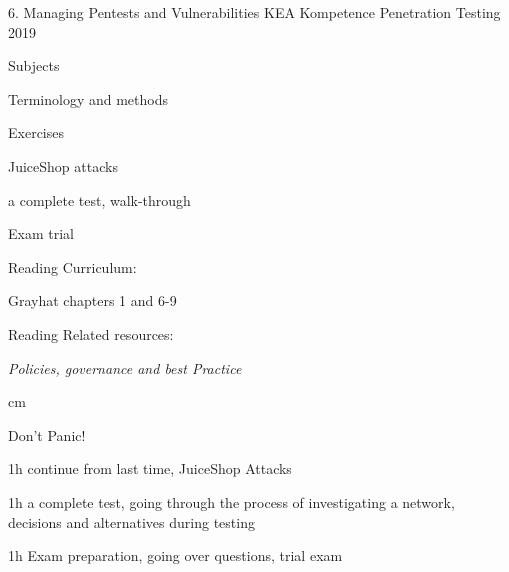 \documentclass[Screen16to9,17pt]{foils}
\begin{document}
\mytitlepage
{6. Managing Pentests and Vulnerabilities}
{KEA Kompetence Penetration Testing 2019}





\begin{list1}
\item Subjects
\begin{list2}
\item Terminology and methods

\end{list2}
\item Exercises
\begin{list2}
\item JuiceShop attacks
\item a complete test, walk-through
\item Exam trial
\end{list2}
\item  Reading Curriculum:
\begin{list2}
\item Grayhat chapters 1 and 6-9
\end{list2}
\item  Reading Related resources:
\begin{list2}
\item \emph{Policies, governance and best Practice}
\end{list2}
\end{list1}



 cm

\centerline{\color{titlecolor}\LARGE Don't Panic!}


\begin{list1}
\item 1h continue from last time, JuiceShop Attacks
\item 1h a complete test, going through the process of investigating a network, decisions and alternatives during testing
\item 1h Exam preparation, going over questions, trial exam
\end{list1}





\end{document}
